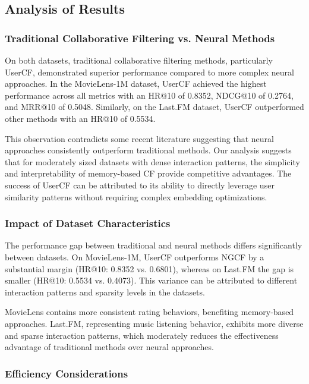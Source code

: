 \documentclass[sigconf,nonacm]{acmart} %
\begin{document}
\vspace{6cm}
\subsection{Analysis of Results}  

\subsubsection{Traditional Collaborative Filtering vs. Neural Methods}  

On both datasets, traditional collaborative filtering methods, particularly UserCF, demonstrated superior performance compared to more complex neural approaches. In the MovieLens-1M dataset, UserCF achieved the highest performance across all metrics with an HR@10 of 0.8352, NDCG@10 of 0.2764, and MRR@10 of 0.5048. Similarly, on the Last.FM dataset, UserCF outperformed other methods with an HR@10 of 0.5534.  

This observation contradicts some recent literature suggesting that neural approaches consistently outperform traditional methods. Our analysis suggests that for moderately sized datasets with dense interaction patterns, the simplicity and interpretability of memory-based CF provide competitive advantages. The success of UserCF can be attributed to its ability to directly leverage user similarity patterns without requiring complex embedding optimizations.  

\subsubsection{Impact of Dataset Characteristics}  

The performance gap between traditional and neural methods differs significantly between datasets. On MovieLens-1M, UserCF outperforms NGCF by a substantial margin (HR@10: 0.8352 vs. 0.6801), whereas on Last.FM the gap is smaller (HR@10: 0.5534 vs. 0.4073). This variance can be attributed to different interaction patterns and sparsity levels in the datasets.  

MovieLens contains more consistent rating behaviors, benefiting memory-based approaches. Last.FM, representing music listening behavior, exhibits more diverse and sparse interaction patterns, which moderately reduces the effectiveness advantage of traditional methods over neural approaches.  

\subsubsection{Efficiency Considerations}  
\end{document}
